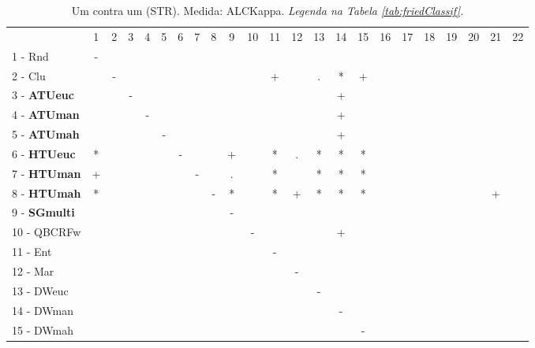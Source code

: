 \begin{table}[h]
\caption{Um contra um (STR). Medida: ALCKappa. \textit{Legenda na Tabela \ref{tab:friedClassif}.}}
\begin{center}\begin{tabular}{lcc|cc|cc|cc|cc|cc|cc|cc|cc|cc|cc}
 			& 1 & 2 & 3 & 4 & 5 & 6 & 7 & 8 & 9 & 10 & 11 & 12 & 13 & 14 & 15 & 16 & 17 & 18 & 19 & 20 & 21 & 22\\
1 - Rnd  	& - &   &   &   &   &   &   &   &   &   &   &   &   &   &   &   &   &   &   &   &   &   \\
2 - Clu  	&   & - &   &   &   &   &   &   &   &   & + &   & . & * & + &   &   &   &   &   &   &   \\ \hline
3 - \textbf{ATUeuc}	&   &   & - &   &   &   &   &   &   &   &   &   &   & + &   &   &   &   &   &   &   &   \\
4 - \textbf{ATUman}	&   &   &   & - &   &   &   &   &   &   &   &   &   & + &   &   &   &   &   &   &   &   \\ \hline
5 - \textbf{ATUmah}	&   &   &   &   & - &   &   &   &   &   &   &   &   & + &   &   &   &   &   &   &   &   \\
6 - \textbf{HTUeuc}	& * &   &   &   &   & - &   &   & + &   & * & . & * & * & * &   &   &   &   &   &   &   \\ \hline
7 - \textbf{HTUman}	& + &   &   &   &   &   & - &   & . &   & * &   & * & * & * &   &   &   &   &   &   &   \\
8 - \textbf{HTUmah}	& * &   &   &   &   &   &   & - & * &   & * & + & * & * & * &   &   &   &   &   & + &   \\ \hline
9 - \textbf{SGmulti}	&   &   &   &   &   &   &   &   & - &   &   &   &   &   &   &   &   &   &   &   &   &   \\
10 - QBCRFw	&   &   &   &   &   &   &   &   &   & - &   &   &   & + &   &   &   &   &   &   &   &   \\ \hline
11 - Ent  	&   &   &   &   &   &   &   &   &   &   & - &   &   &   &   &   &   &   &   &   &   &   \\
12 - Mar  	&   &   &   &   &   &   &   &   &   &   &   & - &   &   &   &   &   &   &   &   &   &   \\ \hline
13 - DWeuc	&   &   &   &   &   &   &   &   &   &   &   &   & - &   &   &   &   &   &   &   &   &   \\
14 - DWman	&   &   &   &   &   &   &   &   &   &   &   &   &   & - &   &   &   &   &   &   &   &   \\ \hline
15 - DWmah	&   &   &   &   &   &   &   &   &   &   &   &   &   &   & - &   &   &   &   &   &   &   \\

\end{tabular}
\end{center}
\end{table}
